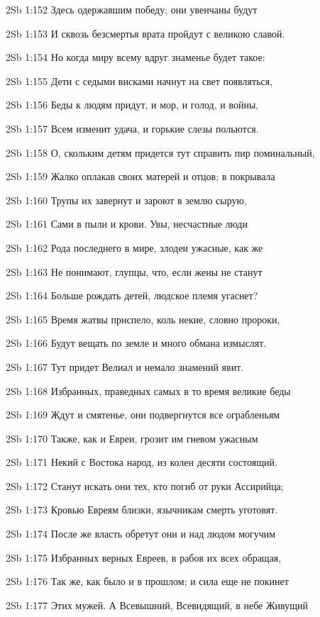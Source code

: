 \vs 2Sb 1:152 Здесь одержавшим победу; они увенчаны будут 

\vs 2Sb 1:153 И сквозь безсмертья врата пройдут с великою славой.

\vs 2Sb 1:154 Но когда миру всему вдруг знаменье будет такое:

\vs 2Sb 1:155 Дети с седыми висками начнут на свет появляться, 

\vs 2Sb 1:156 Беды к людям придут, и мор, и голод, и войны,

\vs 2Sb 1:157 Всем изменит удача, и горькие слезы польются.

\vs 2Sb 1:158 О, скольким детям придется тут справить пир поминальный,

\vs 2Sb 1:159 Жалко оплакав своих матерей и отцов; в покрывала 

\vs 2Sb 1:160 Трупы их завернут и зароют в землю сырую,

\vs 2Sb 1:161 Сами в пыли и крови. Увы, несчастные люди

\vs 2Sb 1:162 Рода последнего в мире, злодеи ужасные, как же

\vs 2Sb 1:163 Не понимают, глупцы, что, если жены не станут

\vs 2Sb 1:164 Больше рождать детей, людское племя угаснет? 

\vs 2Sb 1:165 Время жатвы приспело, коль некие, словно пророки,

\vs 2Sb 1:166 Будут вещать по земле и много обмана измыслят.

\vs 2Sb 1:167 Тут придет Велиал и немало знамений явит.

\vs 2Sb 1:168 Избранных, праведных самых в то время великие беды

\vs 2Sb 1:169 Ждут и смятенье, они подвергнутся все ограбленьям 

\vs 2Sb 1:170 Также, как и Евреи,  грозит им гневом ужасным

\vs 2Sb 1:171 Некий с Востока народ, из колен десяти состоящий.

\vs 2Sb 1:172 Станут искать они тех, кто погиб от руки Ассирийца;

\vs 2Sb 1:173 Кровью Евреям близки, язычникам смерть уготовят.

\vs 2Sb 1:174 После же власть обретут они и над людом могучим

\vs 2Sb 1:175 Избранных верных Евреев, в рабов их всех обращая, 

\vs 2Sb 1:176 Так же, как было и в прошлом; и сила еще не покинет 

\vs 2Sb 1:177 Этих мужей. А Всевышний, Всевидящий, в небе Живущий

